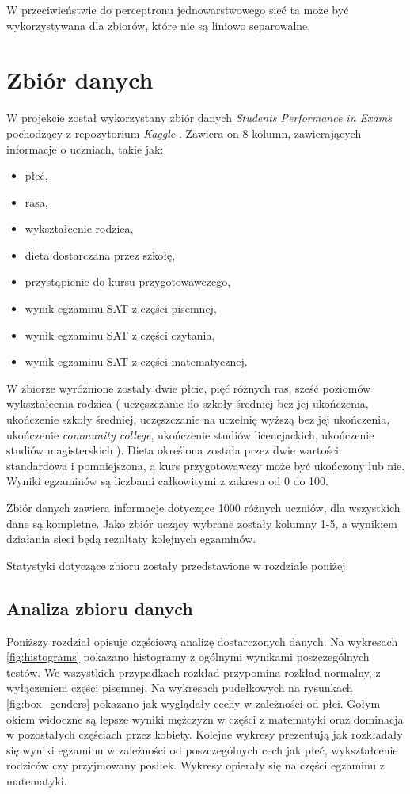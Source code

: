 \documentclass[12pt]{article}
\begin{document}
W przeciwieństwie do perceptronu jednowarstwowego sieć ta może być wykorzystywana dla zbiorów, które nie są liniowo separowalne.


\pagebreak
\section{Zbiór danych}
W projekcie został wykorzystany zbiór danych \textit{Students Performance in Exams} \cite{kaggle-student} pochodzący z repozytorium \textit{Kaggle} \cite{kaggle}. Zawiera on 8 kolumn, zawierających informacje o uczniach, takie jak:
\begin{itemize}
\item płeć,
\item rasa,
\item wykształcenie rodzica,
\item dieta dostarczana przez szkołę,
\item przystąpienie do kursu przygotowawczego,
\item wynik egzaminu SAT z części pisemnej,
\item wynik egzaminu SAT z części czytania,
\item wynik egzaminu SAT z części matematycznej.
\end{itemize}

W zbiorze wyróżnione zostały dwie płcie, pięć różnych ras, sześć poziomów wykształcenia rodzica ( uczęszczanie do szkoły średniej bez jej ukończenia, ukończenie szkoły średniej, uczęszczanie na uczelnię wyższą bez jej ukończenia, ukończenie \textit{community college}, ukończenie studiów licencjackich, ukończenie studiów magisterskich ). Dieta określona została przez dwie wartości: standardowa i pomniejszona, a kurs przygotowawczy może być ukończony lub nie. Wyniki egzaminów są liczbami całkowitymi z zakresu od 0 do 100.

Zbiór danych zawiera informacje dotyczące 1000 różnych uczniów, dla wszystkich dane są kompletne. Jako zbiór uczący wybrane zostały kolumny 1-5, a wynikiem działania sieci będą rezultaty kolejnych egzaminów.

Statystyki dotyczące zbioru zostały przedstawione w rozdziale poniżej.

\subsection{Analiza zbioru danych}
Poniższy rozdział opisuje częściową analizę dostarczonych danych. Na wykresach \ref{fig:histograms} pokazano histogramy z ogólnymi wynikami poszczególnych testów. We wszystkich przypadkach rozkład przypomina rozkład normalny, z wyłączeniem części pisemnej. Na wykresach pudełkowych na rysunkach \ref{fig:box_genders} pokazano jak wyglądały cechy w zależności od płci. Gołym okiem widoczne są lepsze wyniki mężczyzn w części z matematyki oraz dominacja w pozostałych częściach przez kobiety. Kolejne wykresy prezentują jak rozkładały się wyniki egzaminu w zależności od poszczególnych cech jak płeć, wykształcenie rodziców czy przyjmowany posiłek. Wykresy opierały się na części egzaminu z matematyki.
\end{document}
